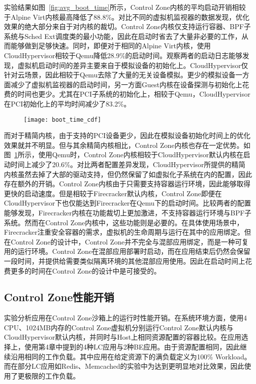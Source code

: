 实验结果如图~\ref{fig:avg_boot_time}所示，Control Zone内核的平均启动开销相较于Alpine Virt内核最高降低了88.8\%。对比不同的虚拟机监视器的数据发现，优化效果的绝大部分来自于对内核的裁切。Control Zone内核仅支持运行容器、BPF子系统与Sched Ext调度类的最小功能，因此在启动时省去了大量非必要的工作，从而能够做到足够快速。同时，即便对于相同的Alpine Virt内核，使用CloudHypervisor相较于Qemu降低28.9\%的启动时间。观察两者的启动日志能够发现，虚拟机启动时间的差异主要来自于模拟设备的初始化上。CloudHypervisor仅针对云场景，因此相较于Qemu去除了大量的无关设备模拟。更少的模拟设备一方面减少了虚拟机监视器的启动时间，另一方面Guest内核在设备探测与初始化上花费的时间也更少。尤其在PCI子系统的初始化上，相较于Qemu，CloudHypervisor在PCI初始化上的平均时间减少了83.2\%。

\begin{figure}[!htbp]
    \centering
    \texttt{[image: boot\_time\_cdf]}
    \label{fig:boot_time_cdf}
\end{figure}

而对于精简内核，由于支持的PCI设备更少，因此在模拟设备初始化时间上的优化效果就并不明显。但与其余精简内核相比，Control Zone内核也存在一定优势。如图~\ref{fig:boot_time_cdf}所示，使用Qemu时，Control Zone内核相较于CloudHypervisor默认内核在启动时间上减少了20.6\%。对比两者配置差异发现，CloudHypervisor所提供的精简内核虽然去掉了大部的驱动支持，但仍然保留了如虚拟化子系统在内的配置，因此存在额外的开销。Control Zone内核由于只需要支持容器运行环境，因此能够取得更快的启动速度。但是相较于Firecracker默认内核，Control Zone即便在CloudHypervisor下也仅能达到Firecracker在Qemu下的启动时间。比较两者的配置能够发现，Firecracker内核在功能裁切上更加激进，不支持容器运行环境与BPF子系统。然而在Control Zone内核中，这些功能则是必要的。在具体使用场景中，Firecracker注重安全容器的需求，虚拟机的生命周期与运行在其中的应用绑定。但在Control Zone的设计中，Control Zone并不完全与混部应用绑定，而是一种可复用的运行环境。Control Zone在混部应用部署时启动，而在应用结束后仍然会保留一段时间，并提供给需要类似隔离环境的其他混部应用使用。因此在启动时间上花费更多的时间在Control Zone的设计中是可接受的。

\subsection{Control Zone性能开销}

实验分析应用在Control Zone沙箱上的运行时性能开销。在系统环境方面，使用4 CPU、1024MB内存的Control Zone虚拟机分别运行Control Zone默认内核与CloudHypervisor默认内核，并同时与Host上相同资源配置的容器比较。在应用选择上，使用第4章中提到的4种LC应用与2种BE应用。由于资源配置相同，因此继续沿用相同的工作负载。其中应用在给定资源下的满负载定义为100\% Workload。而在部分LC应用如Redis、Memcached的实验中为达到更明显地对比效果，因此使用了更极限的工作负载。

